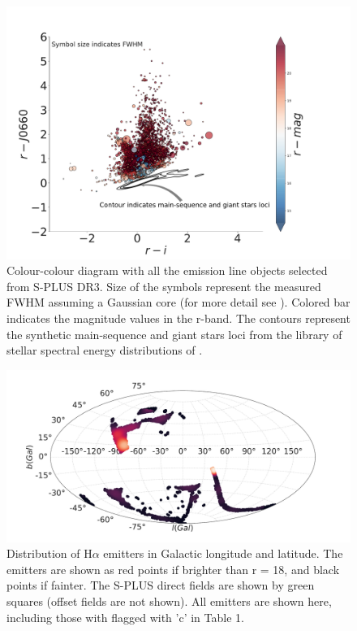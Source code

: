\documentclass[fleqn,usenatbib]{mnras}
\begin{document}
\begin{figure}
	\includegraphics[width=0.9\linewidth]{Figs/final-emitters.pdf}
        \caption{Colour-colour diagram with all the emission line objects selected
          from S-PLUS DR3. Size of the symbols represent the measured FWHM assuming
          a Gaussian core (for more detail see \citealt{Fernandes:2021}). Colored
          bar indicates the magnitude values in the r-band. The contours represent the
          synthetic main-sequence and giant stars loci from the library of stellar
          spectral energy distributions of \citet{Pickles:1998}.}
    \label{fig:emission}
\end{figure}

\begin{figure}
\includegraphics[width=0.9\linewidth]{Figs/halpha-emitters-galactic-aitoff.pdf}
\centering
{}
\caption{Distribution of H{$\alpha$} emitters in Galactic longitude and latitude.
  The emitters are shown as red points if brighter than r = 18, and black points if
  fainter. The S-PLUS direct fields are shown by green squares (offset fields are
  not shown). All emitters are shown here, including those with flagged with 'c' in
Table 1.}
\end{figure}
\end{document}
